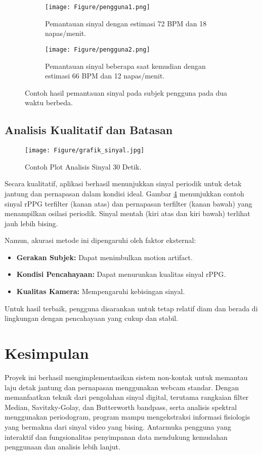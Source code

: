 \documentclass[11pt,a4paper]{article}
\begin{document}
\begin{figure}[htbp]
	\centering
	\begin{subfigure}[b]{0.48\textwidth}
		\centering
		\texttt{[image: Figure/pengguna1.png]}
		\caption{Pemantauan sinyal dengan estimasi 72 BPM dan 18 napas/menit.}
		\label{fig:pengguna1}
	\end{subfigure}
	\hfill %
	\begin{subfigure}[b]{0.48\textwidth}
		\centering
		\texttt{[image: Figure/pengguna2.png]}
		\caption{Pemantauan sinyal beberapa saat kemudian dengan estimasi 66 BPM dan 12 napas/menit.}
		\label{fig:pengguna2}
	\end{subfigure}
	\caption{Contoh hasil pemantauan sinyal pada subjek pengguna pada dua waktu berbeda.}\label{fig:pemantauan_pengguna}
\end{figure}

\subsection{Analisis Kualitatif dan Batasan}
\begin{figure}[htbp] 
    \centering
    \texttt{[image: Figure/grafik\_sinyal.jpg]}
    \caption{Contoh Plot Analisis Sinyal 30 Detik.}
    \label{fig:grafik_30s}
\end{figure}
Secara kualitatif, aplikasi berhasil menunjukkan sinyal periodik untuk detak jantung dan pernapasan dalam kondisi ideal. Gambar \ref{fig:grafik_30s} menunjukkan contoh sinyal rPPG terfilter (kanan atas) dan pernapasan terfilter (kanan bawah) yang menampilkan osilasi periodik. Sinyal mentah (kiri atas dan kiri bawah) terlihat jauh lebih bising.

Namun, akurasi metode ini dipengaruhi oleh faktor eksternal:
\begin{itemize}
    \item \textbf{Gerakan Subjek:} Dapat menimbulkan motion artifact.
    \item \textbf{Kondisi Pencahayaan:} Dapat menurunkan kualitas sinyal rPPG.
    \item \textbf{Kualitas Kamera:} Mempengaruhi kebisingan sinyal.
\end{itemize}
Untuk hasil terbaik, pengguna disarankan untuk tetap relatif diam dan berada di lingkungan dengan pencahayaan yang cukup dan stabil.

\FloatBarrier 

\section{Kesimpulan}
Proyek ini berhasil mengimplementasikan sistem non-kontak untuk memantau laju detak jantung dan pernapasan menggunakan webcam standar. Dengan memanfaatkan teknik dari pengolahan sinyal digital, terutama rangkaian filter Median, Savitzky-Golay, dan Butterworth bandpass, serta analisis spektral menggunakan periodogram, program mampu mengekstraksi informasi fisiologis yang bermakna dari sinyal video yang bising. Antarmuka pengguna yang interaktif dan fungsionalitas penyimpanan data mendukung kemudahan penggunaan dan analisis lebih lanjut.
\end{document}
